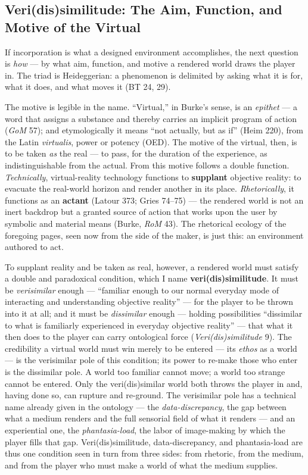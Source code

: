 \documentclass{article}
\begin{document}
\bigskip

\subsection*{Veri(dis)similitude: The Aim, Function, and Motive of the Virtual}

If incorporation is what a designed environment accomplishes, the next question is \textit{how} — by what aim, function, and motive a rendered world draws the player in. The triad is Heideggerian: a phenomenon is delimited by asking what it is for, what it does, and what moves it (BT 24, 29).

The motive is legible in the name. ``Virtual,'' in Burke's sense, is an \textit{epithet} — a word that assigns a substance and thereby carries an implicit program of action (\textit{GoM} 57); and etymologically it means ``not actually, but as if'' (Heim 220), from the Latin \textit{virtualis}, power or potency (OED). The motive of the virtual, then, is to be taken \textit{as} the real — to pass, for the duration of the experience, as indistinguishable from the actual. From this motive follows a double function. \textit{Technically}, virtual-reality technology functions to \textbf{supplant} objective reality: to evacuate the real-world horizon and render another in its place. \textit{Rhetorically}, it functions as an \textbf{actant} (Latour 373; Gries 74–75) — the rendered world is not an inert backdrop but a granted source of action that works upon the user by symbolic and material means (Burke, \textit{RoM} 43). The rhetorical ecology of the foregoing pages, seen now from the side of the maker, is just this: an environment authored to act.

To supplant reality and be taken as real, however, a rendered world must satisfy a double and paradoxical condition, which I name \textbf{veri(dis)similitude}. It must be \textit{verisimilar} enough — ``familiar enough to our normal everyday mode of interacting and understanding objective reality'' — for the player to be thrown into it at all; and it must be \textit{dissimilar} enough — holding possibilities ``dissimilar to what is familiarly experienced in everyday objective reality'' — that what it then does to the player can carry ontological force (\textit{Veri(dis)similitude} 9). The credibility a virtual world must win merely to be entered — its \textit{ethos} as a world — is the verisimilar pole of this condition; its power to re-make those who enter is the dissimilar pole. A world too familiar cannot move; a world too strange cannot be entered. Only the veri(dis)similar world both throws the player in and, having done so, can rupture and re-ground. The verisimilar pole has a technical name already given in the ontology — the \textit{data-discrepancy}, the gap between what a medium renders and the full sensorial field of what it renders — and an experiential one, the \textit{phantasia-load}, the labor of image-making by which the player fills that gap. Veri(dis)similitude, data-discrepancy, and phantasia-load are thus one condition seen in turn from three sides: from rhetoric, from the medium, and from the player who must make a world of what the medium supplies.
\end{document}

